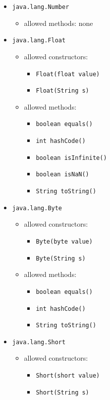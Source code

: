 \documentclass[a4paper]{report}
\begin{document}
\begin{itemize}
\item \texttt{java.lang.Number}
	\begin{itemize}
	\item allowed methods: none
	\end{itemize}
\item \texttt{java.lang.Float}
	\begin{itemize}
	\item allowed constructors:
			\begin{itemize}
				\item \texttt{Float(float value)}
				\item \texttt{Float(String s)}
			\end{itemize}
	\item allowed methods:
			\begin{itemize}
				\item \texttt{boolean equals()}
				\item \texttt{int hashCode()}
				\item \texttt{boolean isInfinite()}
				\item \texttt{boolean isNaN()}
				\item \texttt{String toString()}
			\end{itemize}
	\end{itemize}
\item \texttt{java.lang.Byte}
	\begin{itemize}
	\item allowed constructors:
			\begin{itemize}
				\item \texttt{Byte(byte value)}
				\item \texttt{Byte(String s)}
			\end{itemize}
	\item allowed methods:
			\begin{itemize}
				\item \texttt{boolean equals()}
				\item \texttt{int hashCode()}
				\item \texttt{String toString()}
			\end{itemize}
	\end{itemize}
\item \texttt{java.lang.Short}
	\begin{itemize}
	\item allowed constructors:
			\begin{itemize}
				\item \texttt{Short(short value)}
				\item \texttt{Short(String s)}

\end{itemize}
\end{itemize}
\end{itemize}
\end{document}

